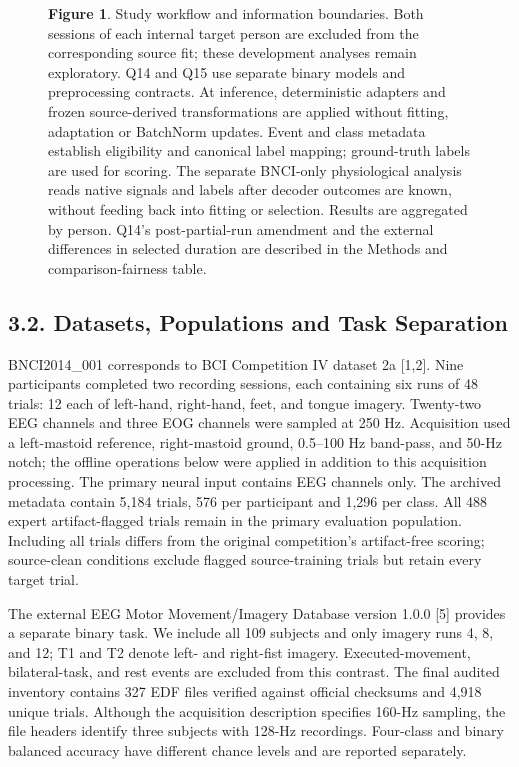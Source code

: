 \documentclass[11pt]{article}
\begin{document}
\begin{figure}[htbp]
{\begin{tikzpicture}[x=1.7cm,y=1.6cm,font=\scriptsize]
\end{tikzpicture}
}
\caption*{\textbf{Figure 1}. Study workflow and information boundaries. Both sessions of each internal target person are excluded from the corresponding source fit; these development analyses remain exploratory. Q14 and Q15 use separate binary models and preprocessing contracts. At inference, deterministic adapters and frozen source-derived transformations are applied without fitting, adaptation or BatchNorm updates. Event and class metadata establish eligibility and canonical label mapping; ground-truth labels are used for scoring. The separate BNCI-only physiological analysis reads native signals and labels after decoder outcomes are known, without feeding back into fitting or selection. Results are aggregated by person. Q14's post-partial-run amendment and the external differences in selected duration are described in the Methods and comparison-fairness table.}
\end{figure}
\subsection*{3.2. Datasets, Populations and Task Separation}
BNCI2014\_001 corresponds to BCI Competition IV dataset 2a [1,2]. Nine participants completed two recording sessions, each containing six runs of 48 trials: 12 each of left-hand, right-hand, feet, and tongue imagery. Twenty-two EEG channels and three EOG channels were sampled at 250 Hz. Acquisition used a left-mastoid reference, right-mastoid ground, 0.5--100 Hz band-pass, and 50-Hz notch; the offline operations below were applied in addition to this acquisition processing. The primary neural input contains EEG channels only. The archived metadata contain 5,184 trials, 576 per participant and 1,296 per class. All 488 expert artifact-flagged trials remain in the primary evaluation population. Including all trials differs from the original competition's artifact-free scoring; source-clean conditions exclude flagged source-training trials but retain every target trial.

The external EEG Motor Movement/Imagery Database version 1.0.0 [5] provides a separate binary task. We include all 109 subjects and only imagery runs 4, 8, and 12; T1 and T2 denote left- and right-fist imagery. Executed-movement, bilateral-task, and rest events are excluded from this contrast. The final audited inventory contains 327 EDF files verified against official checksums and 4,918 unique trials. Although the acquisition description specifies 160-Hz sampling, the file headers identify three subjects with 128-Hz recordings. Four-class and binary balanced accuracy have different chance levels and are reported separately.
\end{document}
